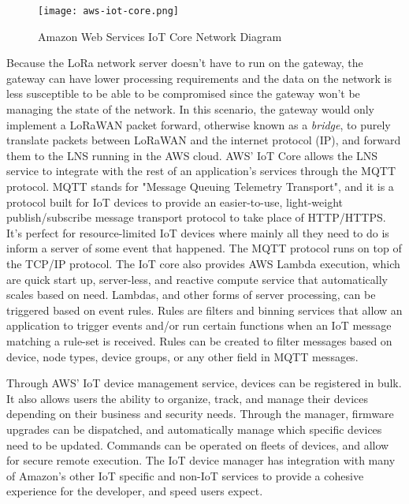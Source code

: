 \begin{figure}
  \centering
  \texttt{[image: aws-iot-core.png]}
  \caption{Amazon Web Services IoT Core Network Diagram}
  \label{aws-iot-core}
\end{figure}

Because the LoRa network server doesn't have to run on the gateway, the gateway can have lower
processing requirements and the data on the network is less susceptible to be able to be compromised
since the gateway won't be managing the state of the network. In this scenario, the gateway would
only implement a LoRaWAN packet forward, otherwise known as a \emph{bridge}, to purely translate
packets between LoRaWAN and the internet protocol (IP), and forward them to the LNS running in the
AWS cloud. AWS' IoT Core allows the LNS service to integrate with the rest of an application's
services through the MQTT protocol. MQTT stands for "Message Queuing Telemetry Transport", and it is
a protocol built for IoT devices to provide an easier-to-use, light-weight publish/subscribe message
transport protocol to take place of HTTP/HTTPS. It's perfect for resource-limited IoT devices where
mainly all they need to do is inform a server of some event that happened. The MQTT protocol runs on
top of the TCP/IP protocol. The IoT core also provides AWS Lambda execution, which are quick start
up, server-less, and reactive compute service that automatically scales based on need. Lambdas, and
other forms of server processing, can be triggered based on event rules. Rules are filters and
binning services that allow an application to trigger events and/or run certain functions when an
IoT message matching a rule-set is received. Rules can be created to filter messages based on
device, node types, device groups, or any other field in MQTT messages.


Through AWS' IoT device management service, devices can be registered in bulk. It also allows users
the ability to organize, track, and manage their devices depending on their business and security
needs. Through the manager, firmware upgrades can be dispatched, and automatically manage which
specific devices need to be updated. Commands can be operated on fleets of devices, and allow for
secure remote execution. The IoT device manager has integration with many of Amazon's other IoT
specific and non-IoT services to provide a cohesive experience for the developer, and speed users
expect.


